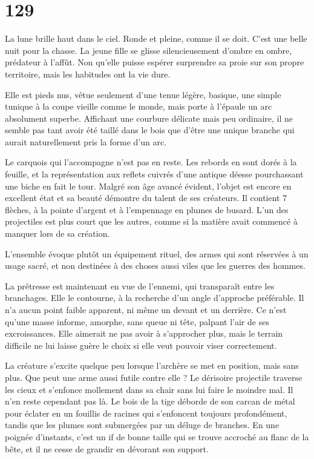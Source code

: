 \documentclass{report}
\newcommand{\gsection}[1]{
    \section{#1}
    \label{section-#1}
}
\begin{document}
\gsection{129}

La lune brille haut dans le ciel. Ronde et pleine, comme il se doit. C'est une belle nuit pour la chasse. La jeune fille se glisse silencieusement d'ombre en ombre, prédateur à l'affût. Non qu'elle puisse espérer surprendre sa proie sur son propre territoire, mais les habitudes ont la vie dure.

Elle est pieds nus, vêtue seulement d'une tenue légère, basique, une simple tunique à la coupe vieille comme le monde, mais porte à l'épaule un arc absolument superbe. Affichant une courbure délicate mais peu ordinaire, il ne semble pas tant avoir été taillé dans le bois que d'être une unique branche qui aurait naturellement pris la forme d'un arc.

Le carquois qui l'accompagne n'est pas en reste. Les rebords en sont dorés à la feuille, et la représentation aux reflets cuivrés d'une antique déesse pourchassant une biche en fait le tour. Malgré son âge avancé évident, l'objet est encore en excellent état et sa beauté démontre du talent de ses créateurs. Il contient 7 flèches, à la pointe d'argent et à l'empennage en plumes de busard. L'un des projectiles est plus court que les autres, comme si la matière avait commencé à manquer lors de sa création. 

L'ensemble évoque plutôt un équipement rituel, des armes qui sont réservées à un usage sacré, et non destinées à  des choses aussi viles que les guerres des hommes.

La prêtresse est maintenant en vue de l'ennemi, qui transparaît entre les branchages. Elle le contourne, à la recherche d'un angle d'approche préférable. Il n'a aucun point faible apparent, ni même un devant et un derrière. Ce n'est qu'une masse informe, amorphe, sans queue ni tête, palpant l'air de ses excroissances. Elle aimerait ne pas avoir à s'approcher plus, mais le terrain difficile ne lui laisse guère le choix si elle veut pouvoir viser correctement. 

La créature s'excite quelque peu lorsque l'archère se met en position, mais sans plus. Que peut une arme aussi futile contre elle ? Le dérisoire projectile traverse les cieux et s'enfonce mollement dans sa chair sans lui faire le moindre mal. Il n'en reste cependant pas là. Le bois de la tige déborde de son carcan de métal pour éclater en un fouillis de racines qui s'enfoncent toujours profondément, tandis que les plumes sont submergées par un déluge de branches. En une poignée d'instants, c'est un if de bonne taille qui se trouve accroché au flanc de la bête, et il ne cesse de grandir en dévorant son support. 
\end{document}
